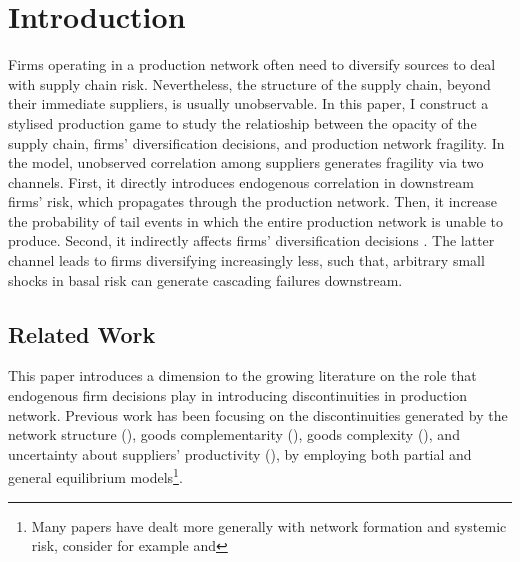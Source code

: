 \documentclass[../../main.tex]{subfiles}
\begin{document}
\section{Introduction}

\iffalse
\notes{
  \begin{enumerate}
    \item Research question
    \item Contribution to the literature
    \item Why do we care?
  \end{enumerate}
}
\fi

Firms operating in a production network often need to diversify sources to deal with supply chain risk. Nevertheless, the structure of the supply chain, beyond their immediate suppliers, is usually unobservable. In this paper, I construct a stylised production game to study the relatioship between the opacity of the supply chain, firms' diversification decisions, and production network fragility. In the model, unobserved correlation among suppliers generates fragility via two channels. First, it directly introduces endogenous correlation in downstream firms' risk, which propagates through the production network. Then, it increase the probability of tail events in which the entire production network is unable to produce. Second, it indirectly affects firms' diversification decisions . The latter channel leads to firms diversifying increasingly less, such that, arbitrary small shocks in basal risk can generate cascading failures downstream.

\subsection{Related Work}

This paper introduces a dimension to the growing literature on the role that endogenous firm decisions play in introducing discontinuities in production network. Previous work has been focusing on the discontinuities generated by the network structure (\cite{baqaee_macroeconomic_2019}), goods complementarity (\cite{acemoglu_endogenous_2020}), goods complexity (\cite{elliott_supply_2022}), and uncertainty about suppliers' productivity (\cite{kopytov_endogenous_2021}), by employing both partial and general equilibrium models\footnote{Many papers have dealt more generally with network formation and systemic risk, consider for example  and }.
\end{document}
